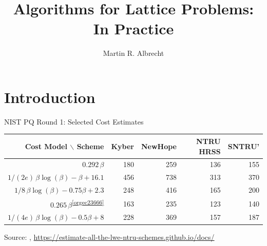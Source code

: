 \documentclass[xcolor=table,10pt,aspectratio=169]{beamer}
\author{Martin R. Albrecht}
\date{Information Security Group, Royal Holloway, University of London\\23 January 2020, Lattice Boot Camp @ Simons\vfill \begin{scriptsize}Based on joint work with Alex Davidson, Amit Deo, Benjamin R. Curtis, Damien Stehlé, Eamonn W. Postlethwaite, Elena Kirshanova, Fernando Virdia, Florian Göpfert, Gottfried Herold, John M. Schanck, Léo Ducas, Marc Stevens, Paul Kirchner, Pierre-Alain Fouque, Rachel Player, Sam Scott, Shi Bai, Thomas Wunderer, Vlad Gheorghiu and Weiqiang Wen as well as the works of many other authors.\end{scriptsize}}
\title{Algorithms for Lattice Problems: In Practice}
\def\enumworstfit{\(1/(2e)\, \beta \log(\beta) - \beta + 16.1\)}
\def\enumavgfit{\(1/8\,\beta \log(\beta) - 0.75\beta + 2.3\)}
\def\qenumworstfit{\(1/(4e)\, \beta \log(\beta) - 0.5\beta + 8\)}
\begin{document}
\maketitle

\section{Introduction}
\label{sec:orgef8769b}
\begin{frame}[label={sec:orge2d9b86}]{NIST PQ Round 1: Selected Cost Estimates}

\begin{center}
\small{
\begin{tabular}{rrrrr}
\textbf{Cost Model} $\backslash$    \textbf{Scheme} & \textbf{Kyber} & \textbf{NewHope} & \textbf{NTRU HRSS} & \textbf{SNTRU'}\\
\hline
\(0.292\,β\)\footnotemark & 180 & 259 & 136 & 155\\
\enumworstfit \footnotemark & 456 & 738 & 313 & 370\\
\enumavgfit \footnotemark & 248 & 416 & 165 & 200\\
\hline
\(0.265\,\beta\)\textsuperscript{\ref{orgec23666}} & 163 & 235 & 123 & 140\\
\qenumworstfit & 228 & 369 & 157 & 187\\
\end{tabular}
}
\end{center}

\scriptsize{
Source: , \url{https://estimate-all-the-lwe-ntru-schemes.github.io/docs/}
}

\vspace{1em}
\end{frame}
\end{document}
